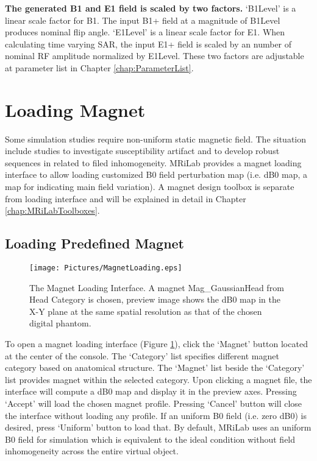 \documentclass{book}%
\begin{document}
\textbf{The generated B1 and E1 field is scaled by two factors.} `B1Level' is a linear scale factor for B1. The input B1+ field at a magnitude of B1Level produces nominal flip angle. `E1Level' is a linear scale factor for E1. When calculating time varying SAR, the input E1+ field is scaled by an number of nominal RF amplitude normalized by E1Level. These two factors are adjustable at parameter list in Chapter \ref{chap:ParameterList}.


\section{Loading Magnet}

Some simulation studies require non-uniform static magnetic field. The situation include studies to investigate susceptibility artifact and to develop robust sequences in related to filed inhomogeneity. MRiLab provides a magnet loading interface to allow loading customized B0 field perturbation map (i.e. dB0 map, a map for indicating main field variation). A magnet design toolbox is separate from loading interface and will be explained in detail in Chapter \ref{chap:MRiLabToolboxes}.

\subsection{Loading Predefined Magnet}

\begin{figure}[htbp]
	\centering
		\texttt{[image: Pictures/MagnetLoading.eps]}
	\caption{The Magnet Loading Interface. A magnet Mag\_GaussianHead from Head Category is chosen, preview image shows the dB0 map in the X-Y plane at the same spatial resolution as that of the chosen digital phantom.}
	\label{fig:MagnetLoading}
\end{figure}

To open a magnet loading interface (Figure \ref{fig:MagnetLoading}), click the `Magnet' button located at the center of the console. The `Category' list specifies different magnet category based on anatomical structure. The `Magnet' list beside the `Category' list provides magnet within the selected category. Upon clicking a magnet file, the interface will compute a dB0 map and display it in the preview axes. Pressing `Accept' will load the chosen magnet profile. Pressing `Cancel' button will close the interface without loading any profile. If an uniform B0 field (i.e. zero dB0) is desired, press `Uniform' button to load that. By default, MRiLab uses an uniform B0 field for simulation which is equivalent to the ideal condition without field inhomogeneity across the entire virtual object. \\
\end{document}
